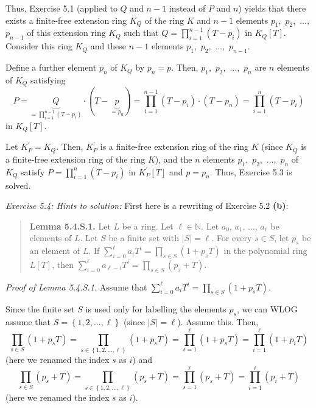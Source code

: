 \documentclass[numbers=enddot,12pt,final,onecolumn,notitlepage]{scrartcl}%
\begin{document}
Thus, Exercise 5.1 (applied to $Q$ and $n-1$ instead of $P$ and $n$) yields
that there exists a finite-free extension ring $K_{Q}$ of the ring $K$ and
$n-1$ elements $p_{1},$ $p_{2},$ $...,$ $p_{n-1}$ of this extension ring
$K_{Q}$ such that $Q=\prod\limits_{i=1}^{n-1}\left(  T-p_{i}\right)  $ in
$K_{Q}\left[  T\right]  $. Consider this ring $K_{Q}$ and these $n-1$ elements
$p_{1},$ $p_{2},$ $...,$ $p_{n-1}$.

Define a further element $p_{n}$ of $K_{Q}$ by $p_{n}=p$. Then, $p_{1},$
$p_{2},$ $...,$ $p_{n}$ are $n$ elements of $K_{Q}$ satisfying%
\[
P=\underbrace{Q}_{=\prod\limits_{i=1}^{n-1}\left(  T-p_{i}\right)  }%
\cdot\left(  T-\underbrace{p}_{=p_{n}}\right)  =\prod\limits_{i=1}%
^{n-1}\left(  T-p_{i}\right)  \cdot\left(  T-p_{n}\right)  =\prod
\limits_{i=1}^{n}\left(  T-p_{i}\right)
\]
in $K_{Q}\left[  T\right]  $.

Let $K_{P}^{\prime}=K_{Q}$. Then, $K_{P}^{\prime}$ is a finite-free extension
ring of the ring $K$ (since $K_{Q}$ is a finite-free extension ring of the
ring $K$), and the $n$ elements $p_{1},$ $p_{2},$ $...,$ $p_{n}$ of $K_{Q}$
satisfy $P=\prod\limits_{i=1}^{n}\left(  T-p_{i}\right)  $ in $K_{P}^{\prime
}\left[  T\right]  $ and $p=p_{n}$. Thus, Exercise 5.3 is solved.

\textit{Exercise 5.4: Hints to solution:} First here is a rewriting of
Exercise 5.2 \textbf{(b)}:

\begin{quote}
\textbf{Lemma 5.4.S.1.} Let $L$ be a ring. Let $\ell\in\mathbb{N}$. Let
$a_{0}$, $a_{1}$, $...$, $a_{\ell}$ be elements of $L$. Let $S$ be a finite
set with $\left\vert S\right\vert =\ell$. For every $s\in S$, let $p_{s}$ be
an element of $L$. If $\sum\limits_{i=0}^{\ell}a_{i}T^{i}=\prod\limits_{s\in
S}\left(  1+p_{s}T\right)  $ in the polynomial ring $L\left[  T\right]  $,
then $\sum\limits_{i=0}^{\ell}a_{\ell-i}T^{i}=\prod\limits_{s\in S}\left(
p_{s}+T\right)  $.
\end{quote}

\textit{Proof of Lemma 5.4.S.1.} Assume that $\sum\limits_{i=0}^{\ell}%
a_{i}T^{i}=\prod\limits_{s\in S}\left(  1+p_{s}T\right)  $.

Since the finite set $S$ is used only for labelling the elements $p_{s}$, we
can WLOG assume that $S=\left\{  1,2,...,\ell\right\}  $ (since $\left\vert
S\right\vert =\ell$). Assume this. Then,
\[
\prod\limits_{s\in S}\left(  1+p_{s}T\right)  =\prod\limits_{s\in\left\{
1,2,...,\ell\right\}  }\left(  1+p_{s}T\right)  =\prod\limits_{s=1}^{\ell
}\left(  1+p_{s}T\right)  =\prod\limits_{i=1}^{\ell}\left(  1+p_{i}T\right)
\]
(here we renamed the index $s$ as $i$) and%
\[
\prod\limits_{s\in S}\left(  p_{s}+T\right)  =\prod\limits_{s\in\left\{
1,2,...,\ell\right\}  }\left(  p_{s}+T\right)  =\prod\limits_{s=1}^{\ell
}\left(  p_{s}+T\right)  =\prod\limits_{i=1}^{\ell}\left(  p_{i}+T\right)
\]
(here we renamed the index $s$ as $i$).
\end{document}
